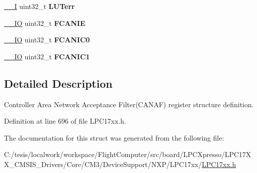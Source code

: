 \begin{DoxyCompactItemize}
\item 
\hypertarget{struct_l_p_c___c_a_n_a_f___type_def_a3906d84d280b16221f3abfc14ec40bd7}{\hyperlink{group___c_m_s_i_s__core__definitions_gaf63697ed9952cc71e1225efe205f6cd3}{\-\_\-\-\_\-\-I} uint32\-\_\-t {\bfseries \-L\-U\-Terr}}\label{struct_l_p_c___c_a_n_a_f___type_def_a3906d84d280b16221f3abfc14ec40bd7}

\item 
\hypertarget{struct_l_p_c___c_a_n_a_f___type_def_a6902f77f625316360c997fefac9aa1f8}{\hyperlink{group___c_m_s_i_s__core__definitions_gaec43007d9998a0a0e01faede4133d6be}{\-\_\-\-\_\-\-I\-O} uint32\-\_\-t {\bfseries \-F\-C\-A\-N\-I\-E}}\label{struct_l_p_c___c_a_n_a_f___type_def_a6902f77f625316360c997fefac9aa1f8}

\item 
\hypertarget{struct_l_p_c___c_a_n_a_f___type_def_a22606ef10c6771dd004b2a55664368cd}{\hyperlink{group___c_m_s_i_s__core__definitions_gaec43007d9998a0a0e01faede4133d6be}{\-\_\-\-\_\-\-I\-O} uint32\-\_\-t {\bfseries \-F\-C\-A\-N\-I\-C0}}\label{struct_l_p_c___c_a_n_a_f___type_def_a22606ef10c6771dd004b2a55664368cd}

\item 
\hypertarget{struct_l_p_c___c_a_n_a_f___type_def_ae2f12718ba3b2a51607b879f5f8c3806}{\hyperlink{group___c_m_s_i_s__core__definitions_gaec43007d9998a0a0e01faede4133d6be}{\-\_\-\-\_\-\-I\-O} uint32\-\_\-t {\bfseries \-F\-C\-A\-N\-I\-C1}}\label{struct_l_p_c___c_a_n_a_f___type_def_ae2f12718ba3b2a51607b879f5f8c3806}

\end{DoxyCompactItemize}


\subsection{\-Detailed \-Description}
\-Controller \-Area \-Network \-Acceptance \-Filter(\-C\-A\-N\-A\-F) register structure definition. 

\-Definition at line 696 of file \-L\-P\-C17xx.\-h.



\-The documentation for this struct was generated from the following file\-:\begin{DoxyCompactItemize}
\item 
\-C\-:/tesis/localwork/workspace/\-Flight\-Computer/src/board/\-L\-P\-C\-Xpresso/\-L\-P\-C17\-X\-X\-\_\-\-C\-M\-S\-I\-S\-\_\-\-Drivers/\-Core/\-C\-M3/\-Device\-Support/\-N\-X\-P/\-L\-P\-C17xx/\hyperlink{_l_p_c17xx_8h}{\-L\-P\-C17xx.\-h}\end{DoxyCompactItemize}

